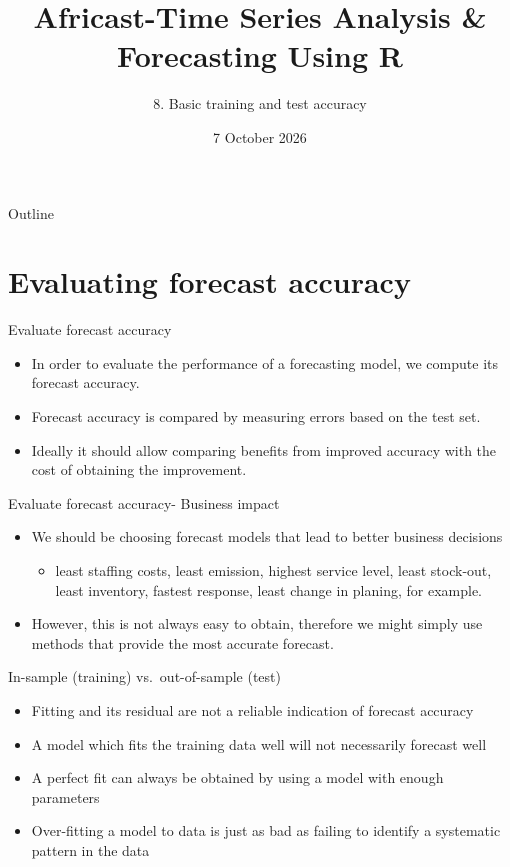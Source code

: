 \documentclass[
  14pt,
  ignorenonframetext,
  aspectratio=169,
]{beamer}
\title{\texorpdfstring{Africast-Time Series Analysis \& Forecasting
Using R}{Africast-Time Series Analysis \& Forecasting Using R}}
\subtitle{\texorpdfstring{8. Basic training and test
accuracy}{8. Basic training and test accuracy}}
\author{}
\date{7 October 2026}
\providecommand{\tightlist}{%
  \setlength{\itemsep}{0pt}\setlength{\parskip}{0pt}}
\begin{document}
\frame{\titlepage}


\begin{frame}{Outline}
\protect{}\label{outline}
\vspace*{0.7cm}\tableofcontents
\end{frame}

\section{Evaluating forecast
accuracy}\label{evaluating-forecast-accuracy}

\begin{frame}{Evaluate forecast accuracy}
\protect{}\label{evaluate-forecast-accuracy}
\begin{itemize}
\tightlist
\item
  In order to evaluate the performance of a forecasting model, we
  compute its forecast accuracy.
\item
  Forecast accuracy is compared by measuring errors based on the test
  set.
\item
  Ideally it should allow comparing benefits from improved accuracy with
  the cost of obtaining the improvement.
\end{itemize}
\end{frame}

\begin{frame}{Evaluate forecast accuracy- Business impact}
\protect{}\label{evaluate-forecast-accuracy--business-impact}
\begin{itemize}
\tightlist
\item
  We should be choosing forecast models that lead to better business
  decisions

  \begin{itemize}
  \tightlist
  \item
    least staffing costs, least emission, highest service level, least
    stock-out, least inventory, fastest response, least change in
    planing, for example.
  \end{itemize}
\item
  However, this is not always easy to obtain, therefore we might simply
  use methods that provide the most accurate forecast.
\end{itemize}
\end{frame}

\begin{frame}{In-sample (training) vs.~out-of-sample (test)}
\protect{}\label{in-sample-training-vs.-out-of-sample-test}
\begin{itemize}
\tightlist
\item
  Fitting and its residual are not a reliable indication of forecast
  accuracy
\item
  A model which fits the training data well will not necessarily
  forecast well
\item
  A perfect fit can always be obtained by using a model with enough
  parameters
\item
  Over-fitting a model to data is just as bad as failing to identify a
  systematic pattern in the data
\end{itemize}
\end{frame}
\end{document}
